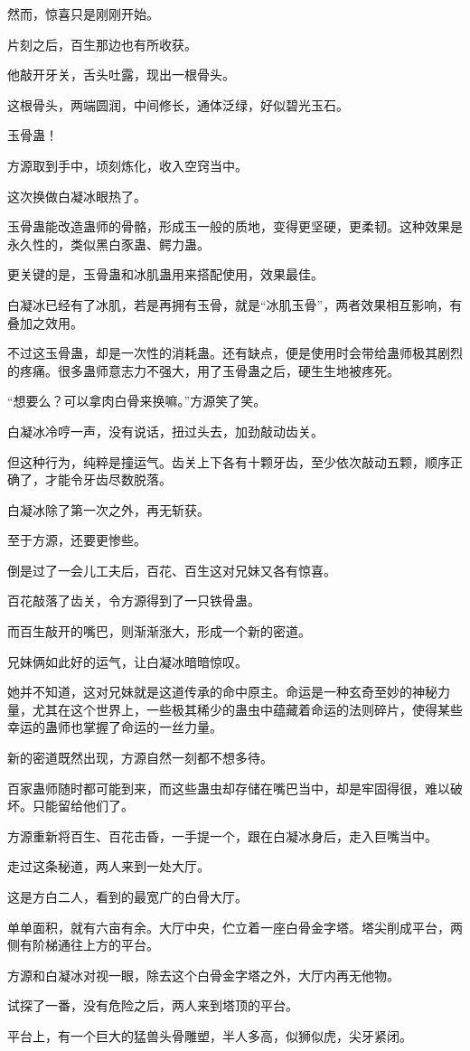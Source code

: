 \begin{this_body}
然而，惊喜只是刚刚开始。

片刻之后，百生那边也有所收获。

他敲开牙关，舌头吐露，现出一根骨头。

这根骨头，两端圆润，中间修长，通体泛绿，好似碧光玉石。

玉骨蛊！

方源取到手中，顷刻炼化，收入空窍当中。

这次换做白凝冰眼热了。

玉骨蛊能改造蛊师的骨骼，形成玉一般的质地，变得更坚硬，更柔韧。这种效果是永久性的，类似黑白豕蛊、鳄力蛊。

更关键的是，玉骨蛊和冰肌蛊用来搭配使用，效果最佳。

白凝冰已经有了冰肌，若是再拥有玉骨，就是“冰肌玉骨”，两者效果相互影响，有叠加之效用。

不过这玉骨蛊，却是一次性的消耗蛊。还有缺点，便是使用时会带给蛊师极其剧烈的疼痛。很多蛊师意志力不强大，用了玉骨蛊之后，硬生生地被疼死。

“想要么？可以拿肉白骨来换嘛。”方源笑了笑。

白凝冰冷哼一声，没有说话，扭过头去，加劲敲动齿关。

但这种行为，纯粹是撞运气。齿关上下各有十颗牙齿，至少依次敲动五颗，顺序正确了，才能令牙齿尽数脱落。

白凝冰除了第一次之外，再无斩获。

至于方源，还要更惨些。

倒是过了一会儿工夫后，百花、百生这对兄妹又各有惊喜。

百花敲落了齿关，令方源得到了一只铁骨蛊。

而百生敲开的嘴巴，则渐渐涨大，形成一个新的密道。

兄妹俩如此好的运气，让白凝冰暗暗惊叹。

她并不知道，这对兄妹就是这道传承的命中原主。命运是一种玄奇至妙的神秘力量，尤其在这个世界上，一些极其稀少的蛊虫中蕴藏着命运的法则碎片，使得某些幸运的蛊师也掌握了命运的一丝力量。

新的密道既然出现，方源自然一刻都不想多待。

百家蛊师随时都可能到来，而这些蛊虫却存储在嘴巴当中，却是牢固得很，难以破坏。只能留给他们了。

方源重新将百生、百花击昏，一手提一个，跟在白凝冰身后，走入巨嘴当中。

走过这条秘道，两人来到一处大厅。

这是方白二人，看到的最宽广的白骨大厅。

单单面积，就有六亩有余。大厅中央，伫立着一座白骨金字塔。塔尖削成平台，两侧有阶梯通往上方的平台。

方源和白凝冰对视一眼，除去这个白骨金字塔之外，大厅内再无他物。

试探了一番，没有危险之后，两人来到塔顶的平台。

平台上，有一个巨大的猛兽头骨雕塑，半人多高，似狮似虎，尖牙紧闭。

\end{this_body}

